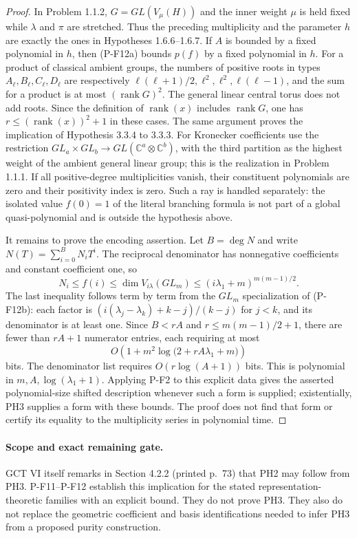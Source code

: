 \begin{proof}
In Problem 1.1.2, $G=GL(V_\mu(H))$ and the inner weight $\mu$ is held
fixed while $\lambda$ and $\pi$ are stretched. Thus the preceding
multiplicity and the parameter $h$ are exactly the ones in
Hypotheses 1.6.6--1.6.7. If $A$ is bounded by a fixed polynomial in $h$,
then (P-F12a) bounds $p(f)$ by a fixed polynomial in $h$.
For a product of classical ambient groups, the numbers of positive
roots in types $A_\ell,B_\ell,C_\ell,D_\ell$ are respectively
$\ell(\ell+1)/2,\ell^2,\ell^2,\ell(\ell-1)$, and the sum for a product
is at most $(\operatorname{rank}G)^2$. The general linear central torus
does not add roots. Since the definition of $\operatorname{rank}(x)$
includes $\operatorname{rank}G$, one has
$r\le(\operatorname{rank}(x))^2+1$ in these cases.
The same argument proves the implication of Hypothesis 3.3.4 to 3.3.3.
For Kronecker coefficients use the restriction
$GL_a\times GL_b\to GL(\mathbb C^a\otimes\mathbb C^b)$, with the
third partition as the highest weight of the ambient general linear
group; this is the realization in Problem 1.1.1.
If all positive-degree multiplicities vanish, their constituent
polynomials are zero and their positivity index is zero. Such a ray
is handled separately: the isolated value $f(0)=1$ of the literal
branching formula is not part of a global quasi-polynomial and is
outside the hypothesis above.

It remains to prove the encoding assertion. Let $B=\deg N$ and write
$N(T)=\sum_{i=0}^B N_iT^i$. The reciprocal denominator has nonnegative
coefficients and constant coefficient one, so
\[
 N_i\le f(i)\le\dim V_{i\lambda}(GL_m)
 \le (i\lambda_1+m)^{m(m-1)/2}.
\]
The last inequality follows term by term from the $GL_m$ specialization
of (P-F12b): each factor is
$(i(\lambda_j-\lambda_k)+k-j)/(k-j)$ for $j<k$, and its denominator
is at least one. Since $B<rA$ and $r\le m(m-1)/2+1$, there are fewer
than $rA+1$ numerator entries, each requiring at most
\[
 O\!\left(1+m^2\log\bigl(2+rA\lambda_1+m\bigr)\right)
\]
bits. The denominator list requires $O(r\log(A+1))$ bits.
This is polynomial in $m,A,\log(\lambda_1+1)$.
Applying P-F2 to this explicit data gives the asserted polynomial-size
shifted description whenever such a form is supplied; existentially,
PH3 supplies a form with these bounds. The proof does not find that
form or certify its equality to the multiplicity series in polynomial
time.
\end{proof}

\paragraph{Scope and exact remaining gate.}
GCT VI itself remarks in Section 4.2.2 (printed p.~73) that PH2 may
follow from PH3. P-F11--P-F12 establish this implication for the stated
representation-theoretic families with an explicit bound. They do not
prove PH3. They also do not replace the geometric coefficient and basis
identifications needed to infer PH3 from a proposed purity construction.

